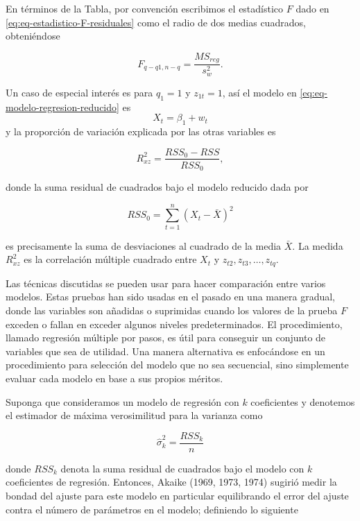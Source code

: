 \documentclass[12pt,]{krantz}
\theoremstyle{definition}
\theoremstyle{definition}
\theoremstyle{definition}
\theoremstyle{remark}
\begin{document}
En términos de la Tabla, por convención escribimos el estadístico \(F\)
dado en \eqref{eq:eq-estadistico-F-residuales} como el radio de dos medias
cuadrados, obteniéndose

\begin{equation}
F_{q-q1,n-q}=\frac{M S_{reg}}{s_w^2}.
\label{eq:eq-estadistico-F-radio-medias}
\end{equation}

Un caso de especial interés es para \(q_1=1\) y \(z_{1t}=1\), así el
modelo en \eqref{eq:eq-modelo-regresion-reducido} es \[X_t=\beta_1+w_t\] y
la proporción de variación explicada por las otras variables es

\begin{equation}
R_{xz}^2=\frac{RSS_0-RSS}{RSS_0},
\label{eq:eq-proporcion-variacion-explicada}
\end{equation}

donde la suma residual de cuadrados bajo el modelo reducido dada por

\begin{equation}
RSS_0=\sum_{t=1}^{n}(X_t-\bar{X})^2
\label{eq:eq-suma-residual-reducido}
\end{equation}

es precisamente la suma de desviaciones al cuadrado de la media
\(\bar{X}\). La medida \(R_{xz}^2\) es la correlación múltiple cuadrado
entre \(X_t\) y \(z_{t2},z_{t3},\ldots,z_{tq}\).

Las técnicas discutidas se pueden usar para hacer comparación entre
varios modelos. Estas pruebas han sido usadas en el pasado en una manera
gradual, donde las variables son añadidas o suprimidas cuando los
valores de la prueba \(F\) exceden o fallan en exceder algunos niveles
predeterminados. El procedimiento, llamado regresión múltiple por pasos,
es útil para conseguir un conjunto de variables que sea de utilidad. Una
manera alternativa es enfocándose en un procedimiento para selección del
modelo que no sea secuencial, sino simplemente evaluar cada modelo en
base a sus propios méritos.

Suponga que consideramos un modelo de regresión con \(k\) coeficientes y
denotemos el estimador de máxima verosimilitud para la varianza como

\begin{equation}
\hat{\sigma}_k^2=\frac{RSS_k}{n}
\label{eq:eq-estimador-emv-varianza}
\end{equation}

donde \(RSS_k\) denota la suma residual de cuadrados bajo el modelo con
\(k\) coeficientes de regresión. Entonces, Akaike (1969, 1973, 1974)
sugirió medir la bondad del ajuste para este modelo en particular
equilibrando el error del ajuste contra el número de parámetros en el
modelo; definiendo lo siguiente
\end{document}
